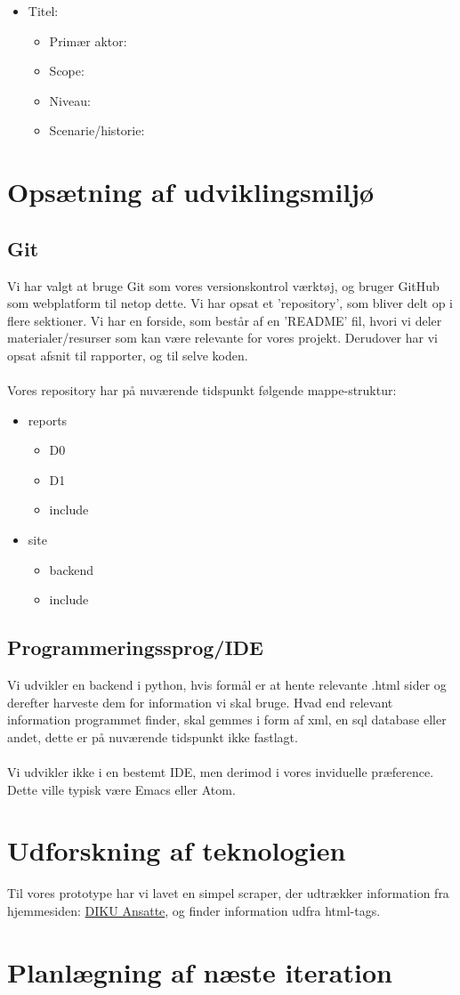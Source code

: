 \documentclass[11pt]{article}
\begin{document}
\begin{itemize}
\item Titel:
  \begin{itemize}
  \item Primær aktor:
  \item Scope:
  \item Niveau:
  \item Scenarie/historie:
  \end{itemize}
\end{itemize}
\section{Opsætning af udviklingsmiljø}
\subsection{Git}
Vi har valgt at bruge Git som vores versionskontrol værktøj, og bruger GitHub som webplatform til netop dette.
Vi har opsat et 'repository', som bliver delt op i flere sektioner. Vi har en forside, som består af en 'README' fil, hvori vi deler materialer/resurser som kan være relevante for vores projekt.
Derudover har vi opsat afsnit til rapporter, og til selve koden. \\ \\
Vores repository har på nuværende tidspunkt følgende mappe-struktur:
\begin{itemize}
\item reports
  \begin{itemize}
  \item D0
  \item D1
  \item include
  \end{itemize}
\item site
  \begin{itemize}
  \item backend
  \item include
  \end{itemize}
\end{itemize}
\subsection{Programmeringssprog/IDE}
Vi udvikler en backend i python, hvis formål er at hente relevante .html sider og derefter harveste dem for information vi skal bruge. Hvad end relevant information programmet finder, skal gemmes i form af xml, en sql database eller andet, dette er på nuværende tidspunkt ikke fastlagt. \\ \\
Vi udvikler ikke i en bestemt IDE, men derimod i vores inviduelle præference. Dette ville typisk være Emacs eller Atom.
\section{Udforskning af teknologien}
Til vores prototype har vi lavet en simpel scraper, der udtrækker information fra hjemmesiden: \href{http://www.diku.dk/Ansatte}{DIKU Ansatte}, og finder information udfra html-tags.
\section{Planlægning af næste iteration}
\end{document}
